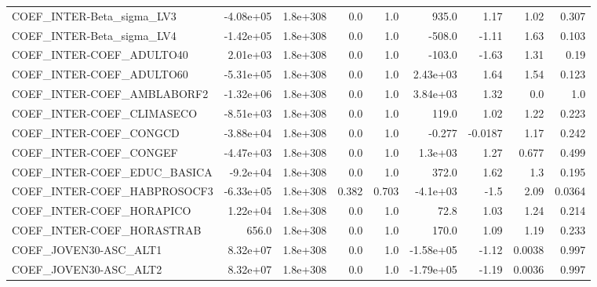 \begin{tabular}{lrrrrrrrr}
COEF\_INTER-Beta\_sigma\_LV3         &   -4.08e+05 &     1.8e+308 &     0.0 &      1.0 &      935.0 &        1.17 &         1.02 &         0.307 \\
COEF\_INTER-Beta\_sigma\_LV4         &   -1.42e+05 &     1.8e+308 &     0.0 &      1.0 &     -508.0 &       -1.11 &         1.63 &         0.103 \\
COEF\_INTER-COEF\_ADULTO40          &    2.01e+03 &     1.8e+308 &     0.0 &      1.0 &     -103.0 &       -1.63 &         1.31 &          0.19 \\
COEF\_INTER-COEF\_ADULTO60          &   -5.31e+05 &     1.8e+308 &     0.0 &      1.0 &   2.43e+03 &        1.64 &         1.54 &         0.123 \\
COEF\_INTER-COEF\_AMBLABORF2        &   -1.32e+06 &     1.8e+308 &     0.0 &      1.0 &   3.84e+03 &        1.32 &          0.0 &           1.0 \\
COEF\_INTER-COEF\_CLIMASECO         &   -8.51e+03 &     1.8e+308 &     0.0 &      1.0 &      119.0 &        1.02 &         1.22 &         0.223 \\
COEF\_INTER-COEF\_CONGCD            &   -3.88e+04 &     1.8e+308 &     0.0 &      1.0 &     -0.277 &     -0.0187 &         1.17 &         0.242 \\
COEF\_INTER-COEF\_CONGEF            &   -4.47e+03 &     1.8e+308 &     0.0 &      1.0 &    1.3e+03 &        1.27 &        0.677 &         0.499 \\
COEF\_INTER-COEF\_EDUC\_BASICA       &    -9.2e+04 &     1.8e+308 &     0.0 &      1.0 &      372.0 &        1.62 &          1.3 &         0.195 \\
COEF\_INTER-COEF\_HABPROSOCF3       &   -6.33e+05 &     1.8e+308 &   0.382 &    0.703 &   -4.1e+03 &        -1.5 &         2.09 &        0.0364 \\
COEF\_INTER-COEF\_HORAPICO          &    1.22e+04 &     1.8e+308 &     0.0 &      1.0 &       72.8 &        1.03 &         1.24 &         0.214 \\
COEF\_INTER-COEF\_HORASTRAB         &       656.0 &     1.8e+308 &     0.0 &      1.0 &      170.0 &        1.09 &         1.19 &         0.233 \\
COEF\_JOVEN30-ASC\_ALT1             &    8.32e+07 &     1.8e+308 &     0.0 &      1.0 &  -1.58e+05 &       -1.12 &       0.0038 &         0.997 \\
COEF\_JOVEN30-ASC\_ALT2             &    8.32e+07 &     1.8e+308 &     0.0 &      1.0 &  -1.79e+05 &       -1.19 &       0.0036 &         0.997 \\

\end{tabular}

